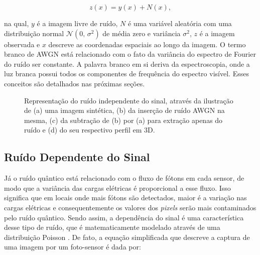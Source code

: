 \begin{equation}
z(x) = y(x) + N(x),
\label{eq:eqCapRuidoTermico}
\end{equation}

\noindent na qual, $y$ é a imagem livre de ruído, $N$ é uma variável aleatória com uma distribuição normal $\mathcal{N}(0,\,\sigma^{2})$ de média zero e variância $\sigma^{2}$, $z$ é a imagem observada e $x$ descreve as coordenadas espaciais ao longo da imagem. O termo branco de \acs{AWGN} está relacionado com  o fato da variância do espectro de Fourier do ruído ser constante. A palavra branco em si deriva da espectroscopia, onde a luz branca possui todos os componentes de frequência do espectro visível. Esses conceitos são detalhados nas próximas seções.

\begin{figure}[!htb]
	\centering
	
	\caption{Representação do ruído independente do sinal, através da ilustração de (a) uma imagem sintética, (b) da inserção de ruído \acs{AWGN} na mesma, (c) da subtração de (b) por (a) para extração apenas do ruído e (d) do seu respectivo perfil em \acs{3D}.}
	
	\hfill
	\hfill
	\hfill
	
	\label{fig:imgCapRuidoGaussiano}
\end{figure}


\subsection{Ruído Dependente do Sinal}

Já o ruído quântico está relacionado com o fluxo de fótons em cada sensor, de modo que a variância das cargas elétricas é proporcional a esse fluxo. Isso significa que em locais onde mais fótons são detectados, maior é a variação nas cargas elétricas e consequentemente os valores dos \textit{pixels} serão mais contaminados pelo ruído quântico. Sendo assim, a dependência do sinal é uma característica desse tipo de ruído, que é matematicamente modelado através de uma distribuição Poisson \cite{bertalmiodenoising2018}. De fato, a equação simplificada que descreve a captura de uma imagem por um foto-sensor é dada por:

